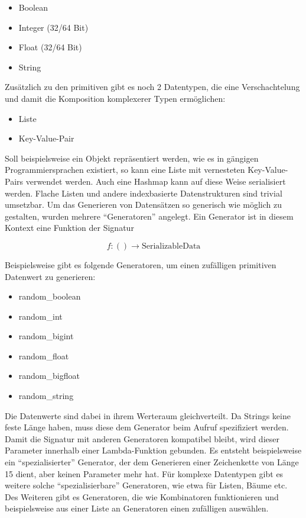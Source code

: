 \documentclass[ngerman]{seminarvorlage}
\begin{document}
\begin{itemize}
  \item Boolean
  \item Integer (32/64 Bit)
  \item Float (32/64 Bit)
  \item String
\end{itemize}

Zusätzlich zu den primitiven gibt es noch 2 Datentypen, die eine Verschachtelung und damit die Komposition komplexerer Typen ermöglichen:

\begin{itemize}
  \item Liste
  \item Key-Value-Pair
\end{itemize}

Soll beispielsweise ein Objekt repräsentiert werden, wie es in gängigen Programmiersprachen existiert, so kann eine Liste mit vernesteten Key-Value-Pairs verwendet werden. Auch eine Hashmap kann auf diese Weise serialisiert werden. Flache Listen und andere indexbasierte Datenstrukturen sind trivial umsetzbar. Um das Generieren von Datensätzen so generisch wie möglich zu gestalten, wurden mehrere ``Generatoren'' angelegt. Ein Generator ist in diesem Kontext eine Funktion der Signatur

$$f : () \to \text{SerializableData}$$

Beispielsweise gibt es folgende Generatoren, um einen zufälligen primitiven Datenwert zu generieren:

\begin{itemize}
  \item random\_boolean
  \item random\_int
  \item random\_bigint
  \item random\_float
  \item random\_bigfloat
  \item random\_string
\end{itemize}

Die Datenwerte sind dabei in ihrem Werteraum gleichverteilt. Da Strings keine feste Länge haben, muss diese dem Generator beim Aufruf spezifiziert werden. Damit die Signatur mit anderen Generatoren kompatibel bleibt, wird dieser Parameter innerhalb einer Lambda-Funktion gebunden. Es entsteht beispielsweise ein ``spezialisierter'' Generator, der dem Generieren einer Zeichenkette von Länge 15 dient, aber keinen Parameter mehr hat. Für komplexe Datentypen gibt es weitere solche ``spezialisierbare'' Generatoren, wie etwa für Listen, Bäume etc. Des Weiteren gibt es Generatoren, die wie Kombinatoren funktionieren und beispielsweise aus einer Liste an Generatoren einen zufälligen auswählen.
\end{document}
